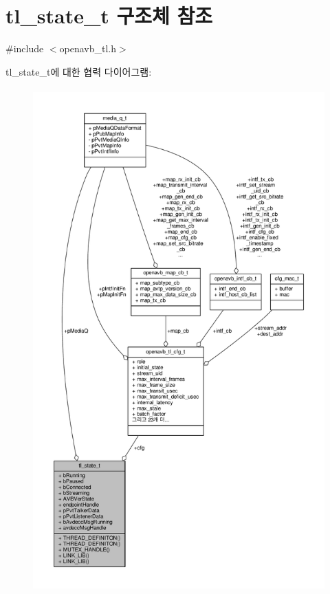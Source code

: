 \hypertarget{structtl__state__t}{}\section{tl\+\_\+state\+\_\+t 구조체 참조}
\label{structtl__state__t}


{\ttfamily \#include $<$openavb\+\_\+tl.\+h$>$}



tl\+\_\+state\+\_\+t에 대한 협력 다이어그램\+:
\nopagebreak
\begin{figure}[H]
\begin{center}
\leavevmode
\includegraphics[height=550pt]{structtl__state__t__coll__graph}
\end{center}
\end{figure}
